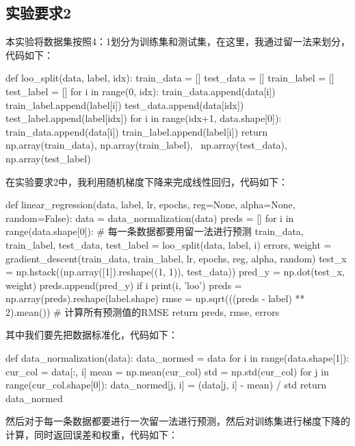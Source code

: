 \documentclass[UTF8,a4paper,10pt]{ctexart}
\begin{document}
\subsection{实验要求2}
本实验将数据集按照4：1划分为训练集和测试集，在这里，我通过留一法来划分，代码如下：

\begin{python}
   def loo_split(data, label, idx):
    train_data = []
    test_data = []
    train_label = []
    test_label = []
    for i in range(0, idx):
        train_data.append(data[i])
        train_label.append(label[i])
    test_data.append(data[idx])
    test_label.append(label[idx])
    for i in range(idx+1, data.shape[0]):
        train_data.append(data[i])
        train_label.append(label[i])
    return np.array(train_data), np.array(train_label), \
           np.array(test_data), np.array(test_label)

\end{python}

在实验要求2中，我利用随机梯度下降来完成线性回归，代码如下：

\begin{python}
   def linear_regression(data, label, lr, epochs, reg=None, alpha=None, random=False):
    data = data_normalization(data)
    preds = []
    for i in range(data.shape[0]):  # 每一条数据都要用留一法进行预测
        train_data, train_label, test_data, test_label = loo_split(data, label, i)
        errors, weight = gradient_descent(train_data, train_label, lr, epochs, reg, alpha, random)
        test_x = np.hstack((np.array([1]).reshape((1, 1)), test_data))
        pred_y = np.dot(test_x, weight)
        preds.append(pred_y)
        if i %
            print(i, 'loo')
    preds = np.array(preds).reshape(label.shape)
    rmse = np.sqrt(((preds - label) ** 2).mean())  # 计算所有预测值的RMSE
    return preds, rmse, errors
\end{python}

其中我们要先把数据标准化，代码如下：


\begin{python}
   def data_normalization(data):
    data_normed = data
    for i in range(data.shape[1]):
        cur_col = data[:, i]
        mean = np.mean(cur_col)
        std = np.std(cur_col)
        for j in range(cur_col.shape[0]):
            data_normed[j, i] = (data[j, i] - mean) / std
    return data_normed
\end{python}

然后对于每一条数据都要进行一次留一法进行预测，然后对训练集进行梯度下降的计算，同时返回误差和权重，代码如下：
\end{document}
